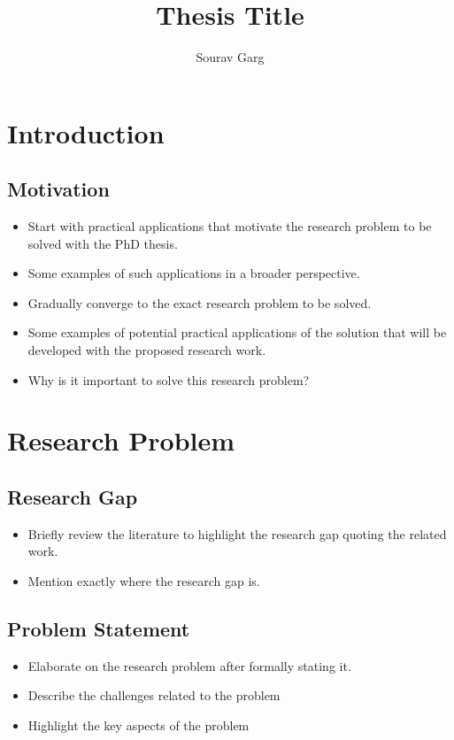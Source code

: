 \documentclass{article}
\title{Thesis Title}
\author{Sourav Garg}
\begin{document}
\maketitle

\section{Introduction}

\subsection{Motivation}
\begin{itemize}
 \item Start with practical applications that motivate the research problem to be solved with the PhD thesis.
 \item Some examples of such applications in a broader perspective.
 \item Gradually converge to the exact research problem to be solved.
 \item Some examples of potential practical applications of the solution that will be developed with the proposed research work.
 \item Why is it important to solve this research problem?
\end{itemize}


\section{Research Problem}

\subsection{Research Gap}
\begin{itemize}
 \item Briefly review the literature to highlight the research gap quoting the related work.
 \item Mention exactly where the research gap is.
\end{itemize}


\subsection{Problem Statement}
\begin{itemize}
 \item Elaborate on the research problem after formally stating it.
 \item Describe the challenges related to the problem
 \item Highlight the key aspects of the problem
\end{itemize}
\end{document}
